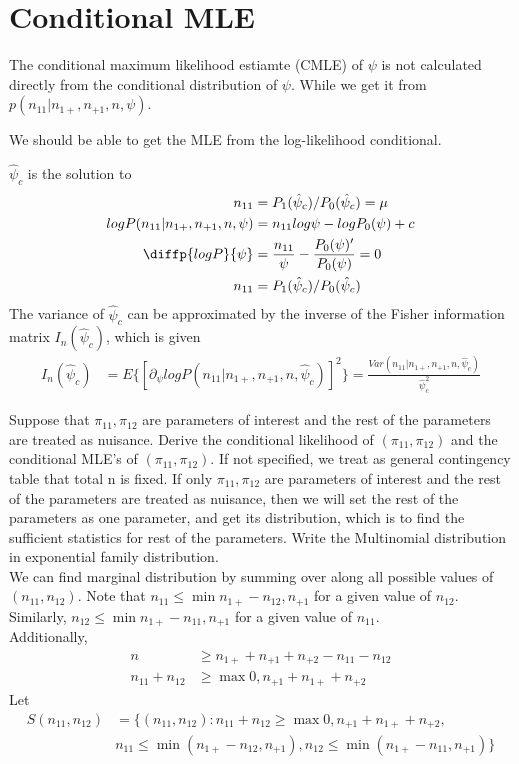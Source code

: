 \section{Conditional MLE}
The conditional maximum likelihood estiamte (CMLE) of $\psi$ is not calculated directly from the conditional distribution of $\psi$. While we get it from $p(n_{11}| n_{1+}, n_{+1}, n, \psi)$.

We should be able to get the MLE from the log-likelihood conditional.

$\hat{\psi}_c$ is the solution to 
\begin{align*}
	n_{11} &= P_1(\hat{\psi}_c)/P_0(\hat{\psi}_c) = \mu\\
	log P(n_{11}| n_{1+}, n_{+1}, n, \psi) &=  n_{11} log \psi - log P_0(\psi) + c\\
	\diffp{log P}{\psi} &= \frac{n_{11}}{\psi} -\frac{P_0(\psi)'}{P_0(\psi)} = 0\\
	n_{11} &= P_1(\hat{\psi}_c)/P_0(\hat{\psi}_c)
\end{align*}
The variance of $\hat{\psi}_c$ can be approximated by the inverse of the Fisher information matrix $I_n(\hat{\psi}_c)$, which is given
\begin{align*}
	I_n(\hat{\psi}_c) &= E\{[ \partial_{\psi} log P(n_{11}| n_{1+}, n_{+1}, n, \hat{\psi}_c)]^2 \} = \frac{Var(n_{11}| n_{1+}, n_{+1}, n, \hat{\psi}_c)}{\hat{\psi}_c^2}
\end{align*}


\item[(g)] Suppose that $\pi_{11}, \pi_{12}$ are parameters of interest and the rest of the parameters are treated as nuisance. Derive the conditional likelihood of $(\pi_{11}, \pi_{12})$ and the conditional MLE's of  $(\pi_{11}, \pi_{12})$.
If not specified, we treat as general contingency table that total n is fixed. If only $\pi_{11}, \pi_{12}$ are parameters of interest and the rest of the parameters are treated as nuisance, then we will set the rest of the parameters as one parameter, and get its distribution, which is to find the sufficient statistics for rest of the parameters.
Write the Multinomial distribution in exponential family distribution.\\
We can find marginal distribution by summing over along all possible values of $(n_{11}, n_{12})$. Note that $n_{11} \leq \min{n_{1+} - n_{12}, n_{+1}}$ for a given value of $n_{12}$. Similarly, $n_{12} \leq \min{n_{1+}- n_{11}, n_{+1}}$ for a given value of $n_{11}$. \\
Additionally,
\begin{align*}
	n & \geq n_{1+} + n_{+1} + n_{+2} - n_{11} - n_{12} \\
	n_{11} + n_{12} & \geq \max{ 0, n_{+1} + n_{1+} + n_{+2}}
\end{align*}
Let
\begin{align*}
	S(n_{11}, n_{12}) &= \{(n_{11}, n_{12}): n_{11} + n_{12} \geq \max{ 0, n_{+1} + n_{1+} + n_{+2}},\\
	&  n_{11} \leq \min{(n_{1+} - n_{12}, n_{+1})}, n_{12} \leq \min{(n_{1+}- n_{11}, n_{+1})}   \} 
\end{align*}


